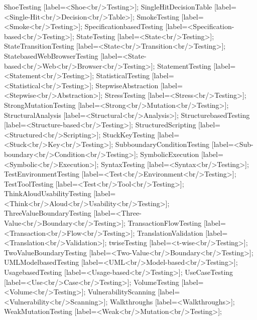 \documentclass{article}
\begin{document}
{ShoeTesting [label=<Shoe<br/>Testing>];
SingleHitDecisionTable [label=<Single-Hit<br/>Decision<br/>Table>];
SmokeTesting [label=<Smoke<br/>Testing>];
SpecificationbasedTesting [label=<Specification-based<br/>Testing>];
StateTesting [label=<State<br/>Testing>];
StateTransitionTesting [label=<State<br/>Transition<br/>Testing>];
StatebasedWebBrowserTesting [label=<State-based<br/>Web<br/>Browser<br/>Testing>];
StatementTesting [label=<Statement<br/>Testing>];
StatisticalTesting [label=<Statistical<br/>Testing>];
StepwiseAbstraction [label=<Stepwise<br/>Abstraction>];
StressTesting [label=<Stress<br/>Testing>];
StrongMutationTesting [label=<Strong<br/>Mutation<br/>Testing>];
StructuralAnalysis [label=<Structural<br/>Analysis>];
StructurebasedTesting [label=<Structure-based<br/>Testing>];
StructuredScripting [label=<Structured<br/>Scripting>];
StuckKeyTesting [label=<Stuck<br/>Key<br/>Testing>];
SubboundaryConditionTesting [label=<Sub-boundary<br/>Condition<br/>Testing>];
SymbolicExecution [label=<Symbolic<br/>Execution>];
SyntaxTesting [label=<Syntax<br/>Testing>];
TestEnvironmentTesting [label=<Test<br/>Environment<br/>Testing>];
TestToolTesting [label=<Test<br/>Tool<br/>Testing>];
ThinkAloudUsabilityTesting [label=<Think<br/>Aloud<br/>Usability<br/>Testing>];
ThreeValueBoundaryTesting [label=<Three-Value<br/>Boundary<br/>Testing>];
TransactionFlowTesting [label=<Transaction<br/>Flow<br/>Testing>];
TranslationValidation [label=<Translation<br/>Validation>];
twiseTesting [label=<t-wise<br/>Testing>];
TwoValueBoundaryTesting [label=<Two-Value<br/>Boundary<br/>Testing>];
UMLModelbasedTesting [label=<UML<br/>Model-based<br/>Testing>];
UsagebasedTesting [label=<Usage-based<br/>Testing>];
UseCaseTesting [label=<Use<br/>Case<br/>Testing>];
VolumeTesting [label=<Volume<br/>Testing>];
VulnerabilityScanning [label=<Vulnerability<br/>Scanning>];
Walkthroughs [label=<Walkthroughs>];
WeakMutationTesting [label=<Weak<br/>Mutation<br/>Testing>];

}
\end{document}

